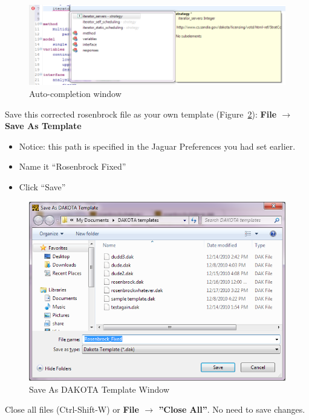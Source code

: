 \begin{figure}[htbp]
  \centering
  \includegraphics[scale=0.6]{images/8iterato}
  \caption{Auto-completion window}
  \label{fig:input:8iterato}
\end{figure}


Save this corrected rosenbrock file as your own template (Figure~\ref{fig:input:9SaveAsTemplate}):
{\bf File $\rightarrow$ Save As Template}
\begin{itemize}
\item Notice: this path is specified in the Jaguar Preferences you had set earlier.
\item Name it ``Rosenbrock Fixed''
\item Click ``Save''
\end{itemize} 
\begin{figure}[htbp]
  \centering
  \includegraphics[scale=0.6]{images/9SaveAsTemplate}
  \caption{Save As DAKOTA Template Window}
  \label{fig:input:9SaveAsTemplate}
\end{figure}


Close all files (Ctrl-Shift-W) or {\bf File $\rightarrow$ ''Close All''}. No need to save changes.


